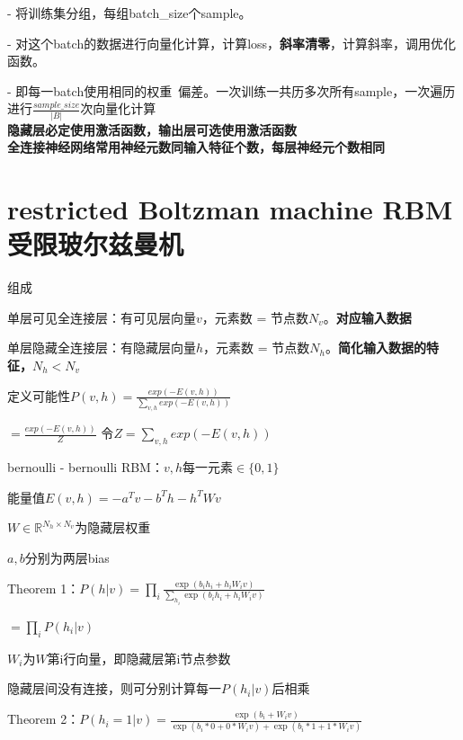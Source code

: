 \documentclass[UTF8]{ctexart}
\begin{document}
  - 将训练集分组，每组batch\_size个sample。
  
  - 对这个batch的数据进行向量化计算，计算loss，\textbf{斜率清零}，计算斜率，调用优化函数。

  - 即每一batch使用相同的权重\ 偏差。一次训练一共历多次所有sample，一次遍历进行$\frac{sample\_size}{|B|}$次向量化计算\\
\textbf{隐藏层必定使用激活函数，输出层可选使用激活函数}\\
\textbf{全连接神经网络常用神经元数同输入特征个数，每层神经元个数相同}


\section{restricted Boltzman machine RBM 受限玻尔兹曼机}
\noindent 组成

  单层可见全连接层：有可见层向量$v$，元素数 = 节点数$N_v$。\textbf{对应输入数据}
  
  单层隐藏全连接层：有隐藏层向量$h$，元素数 = 节点数$N_h$。\textbf{简化输入数据的特征，$N_h < N_v$}

  定义可能性$P(v, h) = \frac{exp(-E(v, h))}{\sum_{v, h}exp(-E(v, h))}$

  \quad $ = \frac{exp(-E(v, h))}{Z}$ 令$Z = \sum_{v, h}exp(-E(v, h))$
  
  bernoulli - bernoulli RBM：$v, h$每一元素$\in \{0, 1\}$

  \quad 能量值$E(v, h) = -a^Tv - b^Th - h^TWv$

  \quad \quad $W \in \mathbb{R}^{N_h \times N_v}$为隐藏层权重

  \quad \quad $a, b$分别为两层bias

  \quad Theorem 1：$P(h | v) = \prod_i \frac{\exp(b_ih_i + h_iW_{i}v)}{\sum_{h_i}\exp(b_ih_i + h_iW_iv)}$
  
  \quad \quad $ = \prod_i P(h_i | v)$

  \quad \quad $W_i$为$W$第i行向量，即隐藏层第i节点参数

  \quad \quad 隐藏层间没有连接，则可分别计算每一$P(h_i | v)$后相乘

  \quad Theorem 2：$P(h_i = 1 | v) = \frac{\exp(b_i + W_{i}v)}{\exp(b_i * 0 + 0 * W_iv) + \exp(b_i * 1 + 1 * W_iv)}$
\end{document}
